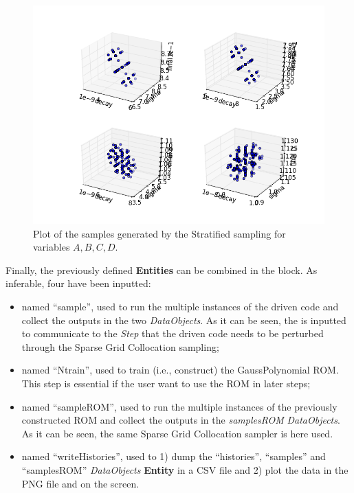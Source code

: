 \begin{enumerate}
\begin{figure}[h!]
  \includegraphics[scale=0.7]{pics/samples_SparseGrid.png}
  \caption{Plot of the samples generated by the Stratified sampling for variables $A,B,C,D$.}
  \label{fig:samplesSparseGridPlotLine}
 \end{figure}
   Finally, the previously defined \textbf{Entities} can be combined in 
   the  block. As inferable, 
   four  have been inputted:
   \begin{itemize}
     \item {} named ``sample'', used to run the multiple  
     instances of the driven code and 
     collect the outputs in the two \textit{DataObjects}. As it can be
     seen, the  is inputted to communicate to the 
     \textit{Step} that the driven code needs to
     be perturbed through the Sparse Grid Collocation  sampling;
     \item {} named ``Ntrain'', used to train (i.e.,
     construct) the GaussPolynomial ROM. This step is essential if the
     user want to use the ROM in later steps;
     \item {} named ``sampleROM'', used to run the multiple  
     instances of the previously constructed ROM and 
     collect the outputs in the \textit{samplesROM} \textit{DataObjects}.  
     As it can be seen, the same Sparse Grid Collocation sampler is
     here used.
     \item  {} named ``writeHistories'', used to 1) dump 
     the ``histories'', ``samples'' and ``samplesROM'' \textit{DataObjects} 
     \textbf{Entity} in a CSV file and 2) plot the data in the PNG file and 
     on the screen.
   \end{itemize}
\end{enumerate} 
